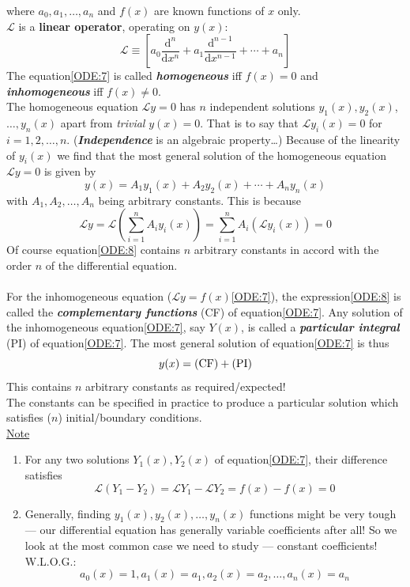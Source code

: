 \documentclass[12pt]{report}
\theoremstyle{definition}
\begin{document}
where $a_0, a_1, \ldots, a_n$ and $f(x)$ are known functions of $x$ only.
\smallskip
\\$\mathscr{L}$ is a \textbf{linear operator}, operating on $y(x)$:\[%
    \mathscr{L} \equiv \left[a_0\frac{\mathrm{d}^{n}}{\mathrm{d}x^{n}} 
    + a_1\frac{\mathrm{d}^{n-1}}{\mathrm{d}x^{n-1}} + \cdots + a_n\right] 
\]
The equation\eqref{ODE:7} is called \textbf{\emph{homogeneous}} iff $f(x) = 0 $
and \textbf{\emph{inhomogeneous}} iff $f(x) \neq 0$.
\\The homogeneous equation $\mathscr{L}y = 0$ has $n$ independent solutions
$y_1(x), y_2(x)$, $\ldots, y_n(x)$ apart from \emph{trivial} $y(x) = 0$.
That is to say that $\mathscr{L} y_i(x) = 0$ for $i = 1, 2, \ldots, n$.
(\textbf{\emph{Independence}} is an algebraic property\ldots)
Because of the linearity of $y_i(x)$ we find that the most general solution of the
homogeneous equation $\mathscr{L} y = 0$ is given by
\begin{equation}\label{ODE:8}
    y(x) = A_1 y_1(x) + A_2 y_2(x) + \cdots + A_n y_n(x)
\end{equation}
with $A_1, A_2, \ldots, A_n$ being arbitrary constants. 
This is because \[
    \mathscr{L}y = \mathscr{L}\left(\sum_{i=1}^{n} A_i y_i(x)\right)
    = \sum_{i=1}^{n} A_i (\mathscr{L}y_i(x)) = 0
\]
Of course equation\eqref{ODE:8} contains $n$ arbitrary constants in accord with the order $n$
of the differential equation.
\\\medskip
\\For the inhomogeneous equation ($\mathscr{L}y = f(x)$\eqref{ODE:7}),
the expression\eqref{ODE:8} is called the \textbf{\emph{complementary functions}} (CF) of equation\eqref{ODE:7}.
Any solution of the inhomogeneous equation\eqref{ODE:7}, say $Y(x)$,
is called a \textbf{\emph{particular integral}} (PI) of equation\eqref{ODE:7}.
The most general solution of equation\eqref{ODE:7} is thus\[
    y(x) = (\textnormal{CF}) + (\textnormal{PI})
\]
This contains $n$ arbitrary constants as required/expected!
\medskip
\\The constants can be specified in practice to produce a particular solution
which satisfies ($n$) initial/boundary conditions.
\\\underline{Note}
\begin{enumerate}[label = (\alph*)]
    \item For any two solutions $Y_1(x), Y_2(x)$ of equation\eqref{ODE:7},
        their difference satisfies \[
            \mathscr{L} (Y_1 - Y_2) = \mathscr{L}Y_1 - \mathscr{L}Y_2 = f(x) - f(x) = 0
        \]
    \item Generally, finding $y_1(x), y_2(x), \ldots, y_n(x)$ functions might be very tough
        --- our differential equation has generally variable coefficients after all!
        So we look at the most common case we need to study --- constant coefficients!
        W.L.O.G.:\[
            a_0(x) = 1, a_1(x) = a_1, a_2(x) = a_2, \ldots, a_n(x) = a_n
        \]
\end{enumerate}
\end{document}
